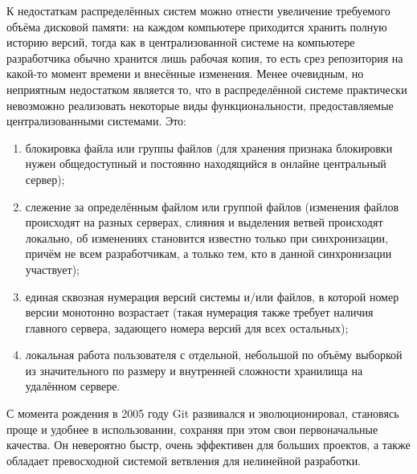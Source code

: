 \documentclass[a4paper,14pt]{report} %
\begin{document}
К недостаткам распределённых систем можно отнести увеличение требуемого объёма дисковой памяти: на каждом компьютере приходится хранить полную историю версий, тогда как в централизованной системе на компьютере разработчика обычно хранится лишь рабочая копия, то есть срез репозитория на какой-то момент времени и внесённые изменения. Менее очевидным, но неприятным недостатком является то, что в распределённой системе практически невозможно реализовать некоторые виды функциональности, предоставляемые централизованными системами. Это:
\begin{enumerate} %
\item блокировка файла или группы файлов (для хранения признака блокировки нужен общедоступный и постоянно находящийся в онлайне центральный сервер);
\item слежение за определённым файлом или группой файлов (изменения файлов происходят на разных серверах, слияния и выделения ветвей происходят локально, об изменениях становится известно только при синхронизации, причём не всем разработчикам, а только тем, кто в данной синхронизации участвует);
\item единая сквозная нумерация версий системы и/или файлов, в которой номер версии монотонно возрастает (такая нумерация также требует наличия главного сервера, задающего номера версий для всех остальных);
\item локальная работа пользователя с отдельной, небольшой по объёму выборкой из значительного по размеру и внутренней сложности хранилища на удалённом сервере.
\end{enumerate}

С момента рождения в 2005 году Git развивался и эволюционировал, становясь проще и удобнее в использовании, сохраняя при этом свои первоначальные качества. Он невероятно быстр, очень эффективен для больших проектов, а также обладает превосходной системой ветвления для нелинейной разработки.
\end{document}
